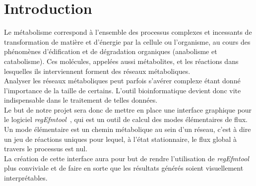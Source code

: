 \chapter*{Introduction}

Le métabolisme correspond à l'ensemble des processus complexes et incessants de transformation de matière et d'énergie par la cellule ou l'organisme, au cours des phénomènes d'édification et de dégradation organiques (anabolisme et catabolisme). 
Ces molécules, appelées aussi métabolites, et les réactions dans lesquelles ils interviennent forment des réseaux métaboliques. \\

Analyser les réseaux métaboliques peut parfois s'avérer complexe étant donné l'importance de la taille de certains. L'outil bioinformatique devient donc vite indispensable dans le traitement de telles données.\\ 
Le but de notre projet sera donc de mettre en place une interface graphique pour le logiciel \emph{regEfmtool}~\cite{regefmtool1:url}, qui est un outil de calcul des modes élémentaires de flux.
Un mode élémentaire est un chemin métabolique au sein d'un réseau, c'est à dire un jeu de réactions uniques pour lequel, à l'état stationnaire, le flux global à travers le processus est nul.\\
La création de cette interface aura pour but de rendre l'utilisation de \emph{regEfmtool} plus conviviale et de faire en sorte que les résultats générés soient visuellement interprétables. 
